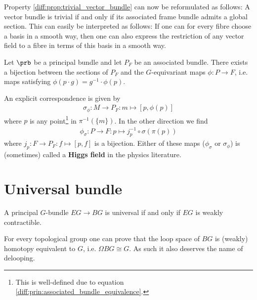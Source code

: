     \begin{property}
        Property \ref{diff:prop:trivial_vector_bundle} can now be reformulated as follows: A vector bundle is trivial if and only if its associated frame bundle admits a global section. This can easily be interpreted as follows: If one can for every fibre choose a basis in a smooth way, then one can also express the restriction of any vector field to a fibre in terms of this basis in a smooth way.
    \end{property}

    \begin{property}\label{diff:prin:section_bijection}
        Let $\prb$ be a principal bundle and let $P_F$ be an associated bundle. There exists a bijection between the sections of $P_F$ and the $G$-equivariant maps $\phi:P\rightarrow F$, i.e. maps satisfying $\phi(p\cdot g) = g^{-1}\cdot\phi(p)$.

        An explicit correspondence is given by
        \begin{gather}
            \sigma_\phi:M\rightarrow P_F:m\mapsto [p, \phi(p)]
        \end{gather}
        where $p$ is any point\footnote{This is well-defined due to equation \ref{diff:prin:associated_bundle_equivalence}.} in $\pi^{-1}(\{m\})$. In the other direction we find
        \begin{gather}
            \label{diff:prin:section_bijection_phi}
            \phi_\sigma:P\rightarrow F: p\mapsto j_p^{-1}\circ\sigma(\pi(p))
        \end{gather}
        where $j_p:F\rightarrow P_F:f\mapsto[p, f]$ is a bijection. Either of these maps ($\phi_\sigma$ or $\sigma_\phi$) is (sometimes) called a \textbf{Higgs field} in the physics literature.
    \end{property}

\section{Universal bundle}

    \begin{property}
        A principal $G$-bundle $EG\rightarrow BG$ is universal if and only if $EG$ is weakly contractible.
    \end{property}
    \begin{property}[Delooping]\label{diff:delooping}
        For every topological group one can prove that the loop space of $BG$ is (weakly) homotopy equivalent to $G$, i.e. $\Omega BG\cong G$. As such it also deserves the name of delooping.
    \end{property}

